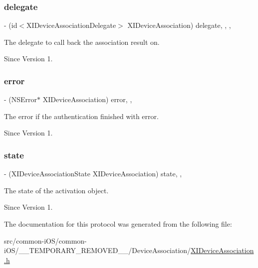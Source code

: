 \subsubsection{\texorpdfstring{delegate}{delegate}}
{\footnotesize\ttfamily -\/ (id$<$X\+I\+Device\+Association\+Delegate$>$ X\+I\+Device\+Association) delegate\hspace{0.3cm}{\ttfamily [read]}, {\ttfamily [write]}, {\ttfamily [nonatomic]}, {\ttfamily [weak]}}



The delegate to call back the association result on. 

\begin{DoxySince}{Since}
Version 1. 
\end{DoxySince}
\hypertarget{protocol_x_i_device_association_01-p_ac1c291d5cffbf45a0025fde23968dbf9}{}\label{protocol_x_i_device_association_01-p_ac1c291d5cffbf45a0025fde23968dbf9} 
\subsubsection{\texorpdfstring{error}{error}}
{\footnotesize\ttfamily -\/ (N\+S\+Error$\ast$ X\+I\+Device\+Association) error\hspace{0.3cm}{\ttfamily [read]}, {\ttfamily [nonatomic]}, {\ttfamily [assign]}}



The error if the authentication finished with error. 

\begin{DoxySince}{Since}
Version 1. 
\end{DoxySince}
\hypertarget{protocol_x_i_device_association_01-p_af70116567dbff00e7c465dcb9d40ae69}{}\label{protocol_x_i_device_association_01-p_af70116567dbff00e7c465dcb9d40ae69} 
\subsubsection{\texorpdfstring{state}{state}}
{\footnotesize\ttfamily -\/ (X\+I\+Device\+Association\+State X\+I\+Device\+Association) state\hspace{0.3cm}{\ttfamily [read]}, {\ttfamily [nonatomic]}, {\ttfamily [assign]}}



The state of the activation object. 

\begin{DoxySince}{Since}
Version 1. 
\end{DoxySince}


The documentation for this protocol was generated from the following file\+:\begin{DoxyCompactItemize}
\item 
src/common-\/i\+O\+S/common-\/i\+O\+S/\+\_\+\+\_\+\+T\+E\+M\+P\+O\+R\+A\+R\+Y\+\_\+\+R\+E\+M\+O\+V\+E\+D\+\_\+\+\_\+/\+Device\+Association/\hyperlink{_x_i_device_association_8h}{X\+I\+Device\+Association.\+h}\end{DoxyCompactItemize}
